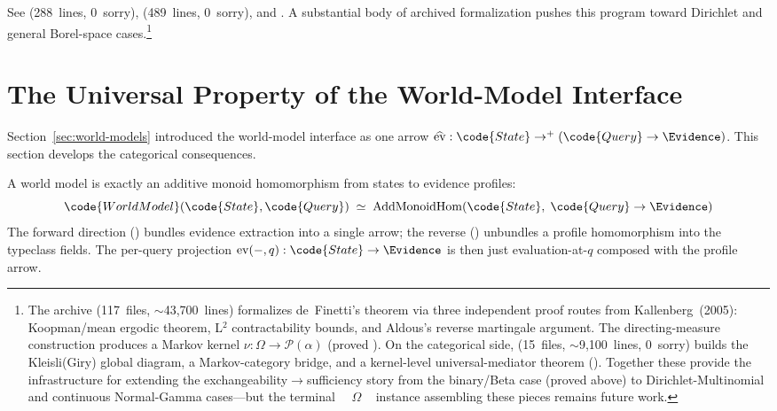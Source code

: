 \documentclass[11pt,openany]{report}
\begin{document}
See
(288~lines, 0~sorry),
(489~lines, 0~sorry), and
.
A substantial body of archived formalization pushes this program toward
Dirichlet and general Borel-space cases.\footnote{The
 archive (117~files,
${\sim}$43{,}700~lines) formalizes de~Finetti's theorem via three
independent proof routes from Kallenberg~(2005): Koopman/mean ergodic
theorem, L$^2$ contractability bounds, and Aldous's reverse martingale
argument.  The directing-measure construction produces a Markov kernel
$\nu : \Omega \to \mathcal{P}(\alpha)$ (proved ).
On the categorical side, 
(15~files, ${\sim}$9{,}100~lines, 0~sorry) builds the Kleisli(Giry)
global diagram, a Markov-category bridge, and a kernel-level
universal-mediator theorem
().  Together
these provide the infrastructure for extending the
exchangeability$\to$sufficiency story from the binary/Beta case
(proved above) to Dirichlet-Multinomial and continuous Normal-Gamma
cases---but the terminal ~~$\Omega$%
\code{)}~ instance assembling these pieces remains future
work.}


\section{The Universal Property of the World-Model Interface}
\label{sec:universal-property}

Section~\ref{sec:world-models} introduced the world-model interface as
one arrow $\widehat{\mathrm{ev}} : \code{State} \to^+
(\code{Query} \to \Evidence)$.  This section develops the categorical
consequences.

\begin{theorem}
\label{thm:universal-property}
A world model is exactly an additive monoid homomorphism from states
to evidence profiles:
\[
  \code{WorldModel}(\code{State}, \code{Query})
  \;\simeq\;
  \mathrm{AddMonoidHom}(\code{State},\; \code{Query} \to \Evidence)
\]
The forward direction () bundles evidence
extraction into a single arrow; the reverse
() unbundles a profile homomorphism into the
typeclass fields.  The per-query projection
$\mathrm{ev}(-,q) : \code{State} \to \Evidence$ is then just
evaluation-at-$q$ composed with the profile arrow.
\end{theorem}
\end{document}
